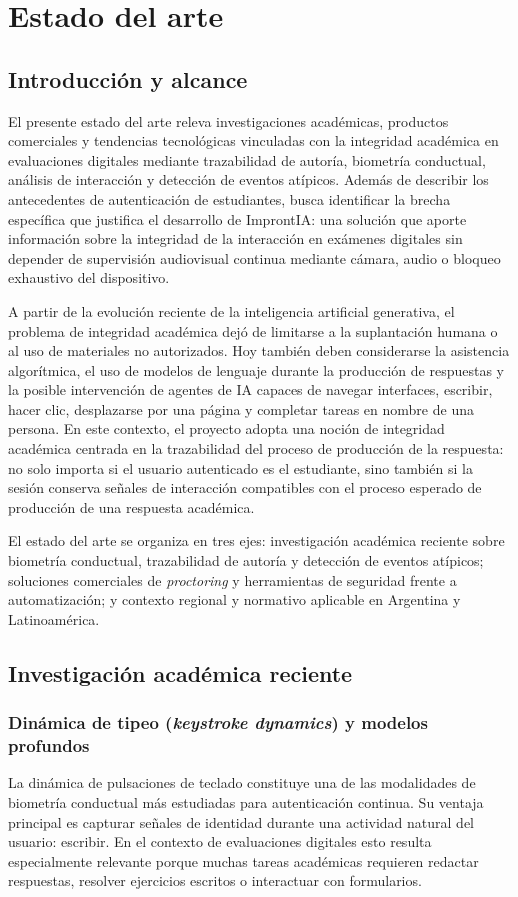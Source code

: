 \section{Estado del arte}
\label{ch:estado_arte}
\subsection{Introducción y alcance}
El presente estado del arte releva investigaciones académicas, productos comerciales y tendencias tecnológicas vinculadas con la integridad académica en evaluaciones digitales mediante trazabilidad de autoría, biometría conductual, análisis de interacción y detección de eventos atípicos. Además de describir los antecedentes de autenticación de estudiantes, busca identificar la brecha específica que justifica el desarrollo de ImprontIA: una solución que aporte información sobre la integridad de la interacción en exámenes digitales sin depender de supervisión audiovisual continua mediante cámara, audio o bloqueo exhaustivo del dispositivo.

A partir de la evolución reciente de la inteligencia artificial generativa, el problema de integridad académica dejó de limitarse a la suplantación humana o al uso de materiales no autorizados. Hoy también deben considerarse la asistencia algorítmica, el uso de modelos de lenguaje durante la producción de respuestas y la posible intervención de agentes de IA capaces de navegar interfaces, escribir, hacer clic, desplazarse por una página y completar tareas en nombre de una persona. En este contexto, el proyecto adopta una noción de integridad académica centrada en la trazabilidad del proceso de producción de la respuesta: no solo importa si el usuario autenticado es el estudiante, sino también si la sesión conserva señales de interacción compatibles con el proceso esperado de producción de una respuesta académica.

El estado del arte se organiza en tres ejes: investigación académica reciente sobre biometría conductual, trazabilidad de autoría y detección de eventos atípicos; soluciones comerciales de \textit{proctoring} y herramientas de seguridad frente a automatización; y contexto regional y normativo aplicable en Argentina y Latinoamérica.

\subsection{Investigación académica reciente}
\subsubsection{Dinámica de tipeo (\textit{keystroke dynamics}) y modelos profundos}
La dinámica de pulsaciones de teclado constituye una de las modalidades de biometría conductual más estudiadas para autenticación continua. Su ventaja principal es capturar señales de identidad durante una actividad natural del usuario: escribir. En el contexto de evaluaciones digitales esto resulta especialmente relevante porque muchas tareas académicas requieren redactar respuestas, resolver ejercicios escritos o interactuar con formularios.

